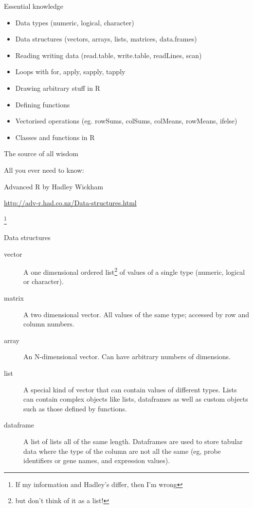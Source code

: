 \documentclass[pdf]{beamer}
\newcommand\blfootnote[1]{%
  \begingroup  %
  \renewcommand\thefootnote{}\footnote{#1}%
  \addtocounter{footnote}{-1}  %
  \endgroup
}
\begin{document}
\begin{frame}{Essential knowledge}
  \begin{itemize}
  \item Data types (numeric, logical, character)
  \item Data structures (vectors, arrays, lists, matrices, data.frames)
  \item Reading writing data (read.table, write.table, readLines, scan)
  \item Loops with for, apply, sapply, tapply
  \item Drawing arbitrary stuff in R
  \item Defining functions
  \item Vectorised operations (eg. rowSums, colSums, colMeans, rowMeans, ifelse)
  \item Classes and functions in R
  \end{itemize}
\end{frame}

\begin{frame}{The source of all wisdom}
  
  \footnotesize All you ever need to know:

  Advanced R \small by Hadley Wickham

  \url{http://adv-r.had.co.nz/Data-structures.html}

\blfootnote{If my information and Hadley's differ, then I'm wrong}
\end{frame}

\begin{frame}{Data structures}

  {\small
  \begin{description}
    \item[vector] A one dimensional ordered list\footnote{but don't think of it as a list!} 
      of values of a single type (numeric, logical or character).
    \item[matrix] A two dimensional vector. All values of the same type; accessed
      by row and column numbers.
    \item[array] An N-dimensional vector. Can have arbitrary numbers of dimensions.
    \item[list] A special kind of vector that can contain values of different types.
      Lists can contain complex objects like
      lists, dataframes as well as custom objects such as those defined by functions.
    \item[dataframe] A list of lists all of the same length. Dataframes are used to store
      tabular data where the type of the column are not all the same (eg, probe identifiers
      or gene names, and expression values).
  \end{description}
}
\end{frame}
\end{document}
